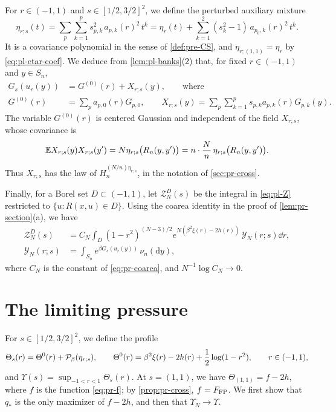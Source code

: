 For $r\in(-1,1)$ and $s\in[1/2,3/2]^2$, we define the perturbed auxiliary mixture
\begin{equation}\label{eq:pl-etars}
\eta_{r;s}(t)=\sum_p\sum_{k=1}^ps_{p,k}^2\,a_{p,k}(r)^2\,t^k
=\eta_r(t)+\sum_{k=1}^2(s_k^2-1)\,a_{p_0,k}(r)^2\,t^k .
\end{equation}
It is a covariance polynomial in the sense of \cref{def:pre-CS}, and $\eta_{r;(1,1)}=\eta_r$ by \eqref{eq:pl-etar-coef}. We deduce from \cref{lem:pl-banks}(2) that, for fixed $r\in(-1,1)$ and $y\in S_n$,
\begin{equation}\label{eq:pl-section-field}
\begin{aligned}
G_s(u_r(y))&=G^{(0)}(r)+X_{r;s}(y),\qquad\text{where}\\
G^{(0)}(r)&=\sum_pa_{p,0}(r)G_{p,0},\qquad
X_{r;s}(y)=\sum_p\sum_{k=1}^ps_{p,k}a_{p,k}(r)G_{p,k}(y).
\end{aligned}
\end{equation}
The variable $G^{(0)}(r)$ is centered Gaussian and independent of the field $X_{r;s}$, whose covariance is
\[
\mathbb E X_{r;s}(y)X_{r;s}(y')=N\eta_{r;s}\bigl(R_n(y,y')\bigr)=n\cdot\frac Nn\,\eta_{r;s}\bigl(R_n(y,y')\bigr).
\]
Thus $X_{r;s}$ has the law of $H_n^{(N/n)\eta_{r;s}}$, in the notation of \cref{sec:pr-cross}.

Finally, for a Borel set $D\subset(-1,1)$, let $\mathcal Z_N^D(s)$ be the integral in \eqref{eq:pl-Z} restricted to $\{u\colon R(x,u)\in D\}$. Using the coarea identity in the proof of \cref{lem:pr-section}(a), we have
\begin{equation}\label{eq:pl-coarea}
\begin{aligned}
\mathcal Z_N^D(s)&=C_N\int_D(1-r^2)^{(N-3)/2}e^{N(\beta^2\xi(r)-2h(r))}\,\mathcal Y_N(r;s)\dd r,\\
\mathcal Y_N(r;s)&=\int_{S_n}e^{\beta G_s(u_r(y))}\,\nu_n(\mathrm dy),
\end{aligned}
\end{equation}
where $C_N$ is the constant of \eqref{eq:pr-coarea}, and $N^{-1}\log C_N\to0$.


\section{The limiting pressure}\label{sec:pl-pressure}

For $s\in[1/2,3/2]^2$, we define the profile
\begin{equation}\label{eq:pl-Theta}
\Theta_s(r)=\Theta^0(r)+\mathcal P_\beta(\eta_{r;s}),\qquad
\Theta^0(r)=\beta^2\xi(r)-2h(r)+\frac12\log(1-r^2),\qquad r\in(-1,1),
\end{equation}
and $\Upsilon(s)=\sup_{-1<r<1}\Theta_s(r)$. At $s=(1,1)$, we have $\Theta_{(1,1)}=f-2h$, where $f$ is the function \eqref{eq:pr-f}; by \cref{prop:pr-cross}, $f=F_{\rm FP}$. We first show that $q_*$ is the only maximizer of $f-2h$, and then that $\Upsilon_N\to\Upsilon$.

